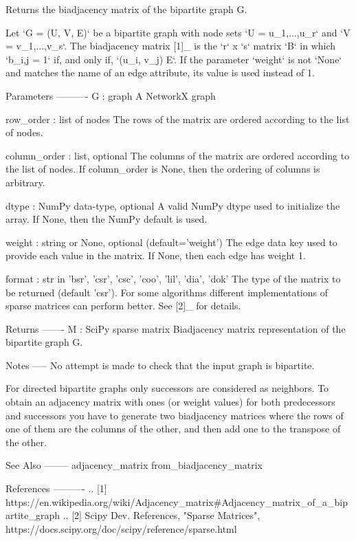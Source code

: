 \begin{DoxyVerb}Returns the biadjacency matrix of the bipartite graph G.

Let `G = (U, V, E)` be a bipartite graph with node sets
`U = u_{1},...,u_{r}` and `V = v_{1},...,v_{s}`. The biadjacency
matrix [1]_ is the `r` x `s` matrix `B` in which `b_{i,j} = 1`
if, and only if, `(u_i, v_j) \in E`. If the parameter `weight` is
not `None` and matches the name of an edge attribute, its value is
used instead of 1.

Parameters
----------
G : graph
   A NetworkX graph

row_order : list of nodes
   The rows of the matrix are ordered according to the list of nodes.

column_order : list, optional
   The columns of the matrix are ordered according to the list of nodes.
   If column_order is None, then the ordering of columns is arbitrary.

dtype : NumPy data-type, optional
    A valid NumPy dtype used to initialize the array. If None, then the
    NumPy default is used.

weight : string or None, optional (default='weight')
   The edge data key used to provide each value in the matrix.
   If None, then each edge has weight 1.

format : str in {'bsr', 'csr', 'csc', 'coo', 'lil', 'dia', 'dok'}
    The type of the matrix to be returned (default 'csr').  For
    some algorithms different implementations of sparse matrices
    can perform better.  See [2]_ for details.

Returns
-------
M : SciPy sparse matrix
    Biadjacency matrix representation of the bipartite graph G.

Notes
-----
No attempt is made to check that the input graph is bipartite.

For directed bipartite graphs only successors are considered as neighbors.
To obtain an adjacency matrix with ones (or weight values) for both
predecessors and successors you have to generate two biadjacency matrices
where the rows of one of them are the columns of the other, and then add
one to the transpose of the other.

See Also
--------
adjacency_matrix
from_biadjacency_matrix

References
----------
.. [1] https://en.wikipedia.org/wiki/Adjacency_matrix#Adjacency_matrix_of_a_bipartite_graph
.. [2] Scipy Dev. References, "Sparse Matrices",
   https://docs.scipy.org/doc/scipy/reference/sparse.html
\end{DoxyVerb}
 \mbox{\label{namespacenetworkx_1_1algorithms_1_1bipartite_1_1matrix_adf67c12e67a9fa4ea37e823947ed3ddd}} 
